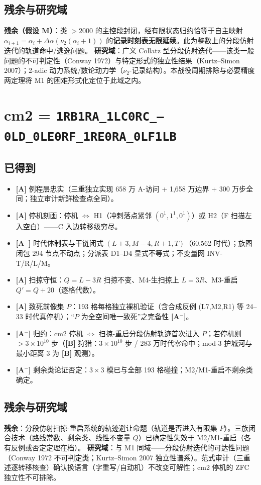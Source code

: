 \documentclass[11pt]{ctexart}
\newcommand{\grA}{\textbf{[A]}}
\newcommand{\grAm}{\textbf{[A$^-$]}}
\newcommand{\grB}{\textbf{[B]}}
\begin{document}
\subsection{残余与研究域}
\textbf{残余（假设 M）}：类 $>2000$ 的主控段封闭，经有限状态归约恰等于自主映射 $\alpha_{i+1}=\alpha_i+\Delta\alpha(\nu_2(\alpha_i+1))$ 的\textbf{记录时刻表无限延续}。此为整数上的分段仿射迭代的轨道命中/逃逸问题。
\textbf{研究域}：广义 Collatz 型分段仿射迭代——该类一般问题的不可判定性（Conway 1972）与特定形式的独立性结果（Kurtz--Simon 2007）；2-adic 动力系统/数论动力学（$\nu_2$-记录结构）。本战役周期排除与必要精度两定理将 M1 的困难形式化定位于此域之内。

\section{cm2 = \texttt{1RB1RA\_1LC0RC\_---0LD\_0LE0RF\_1RE0RA\_0LF1LB}}

\subsection{已得到}
\begin{itemize}
\item \grA{} 例程层忠实（三重独立实现 658 万 A-访问 + 1,658 万边界 + 300 万步全同；独立审计新鲜检查点全同）。
\item \grA{} 停机刻画：停机 $\iff$ H1（冲刺落点紧邻 $(0^1,1^1,0^1)$）或 H2（F 扫描左入空白）——C 入边转移级穷尽。
\item \grAm{} 时代体制表与干链闭式 $(L{+}3,M{-}4,R{+}1,T)$（60,562 时代）；族图闭包 294 节点不动点；分派表 D1--D4 显式不等式；不变量网 INV-T/R/L/M。
\item \grA{} 扫掠守恒：$Q=L-3R$ 扫掠不变、M4-生扫掠上 $L=3R$、M3-重启 $Q'=Q+20$（逐格代数）。
\item \grA{} 致死前像集 $P$：193 格每格独立裸机验证（含合成反例 (L7,M2,R1) 等 24--33 时代真停机）；``$P$ 为全空间唯一致死''之完备性 \grAm{}。
\item \grAm{} 归约：cm2 停机 $\iff$ 扫掠-重启分段仿射轨迹首次进入 $P$；若停机则 $>3\times10^{10}$ 步（\grB{} 狩猎：$3\times10^{10}$ 步 / 283 万时代零命中；mod-3 护城河与最小距离 3 为 \grB{} 观测）。
\item \grAm{} 剩余类论证否定：$3\times3$ 模已与全部 193 格碰撞；M2/M1-重启不剩余类确定。
\end{itemize}

\subsection{残余与研究域}
\textbf{残余}：分段仿射扫掠-重启系统的轨迹避让命题（轨道是否进入有限集 $P$）。三族闭合技术（路线常数、剩余类、线性不变量 $Q$）已确定性失效于 M2/M1-重启（各有反例或否定定理在档）。
\textbf{研究域}：与 M1 同域——分段仿射迭代的可达性问题（Conway 1972 不可判定类；Kurtz--Simon 2007 独立性谱系）。范式审计（三重述逐转移核查）确认换语言（字重写/自动机）不改变可解性；cm2 停机的 ZFC 独立性不可排除。
\end{document}

